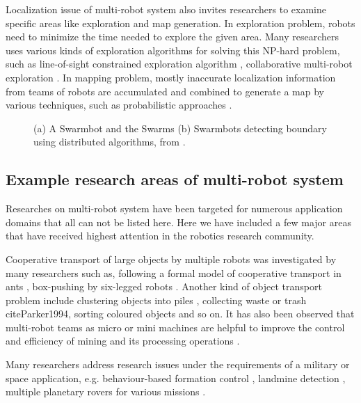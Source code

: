 Localization issue of multi-robot system also invites researchers to examine specific areas like exploration and map generation. In exploration problem, robots need to minimize the time needed to explore the given area. Many researchers uses various kinds of exploration algorithms for solving this NP-hard problem, such as line-of-sight constrained exploration algorithm , collaborative multi-robot exploration \cite{Burgard+2000}. In mapping problem, mostly inaccurate localization information from teams of robots are accumulated and combined to generate a map by various techniques, such as probabilistic approaches \cite{Thurn+2000}.
\begin{figure}
\centering
{} 
\hspace{0.25cm}
\caption{ (a) A Swarmbot and the Swarms 
 (b) Swarmbots detecting boundary using distributed algorithms, from \protect{}.}
\label{fig:swarmbot-boundary-detection}
\end{figure}
\subsection*{Example research areas of multi-robot system}
\label{bg:mrs:eg}
Researches on multi-robot system have been targeted for numerous application domains that all can not be listed here. Here we have included a few major areas that have received highest attention in the robotics research community. 

Cooperative transport of large objects  by multiple robots was investigated by many researchers such as, following a formal model of cooperative transport in ants \cite{Kube+1993}, box-pushing by six-legged robots \cite{Mataric+1995}. Another kind of object transport problem include clustering objects into piles  \cite{Beckers+1994}, collecting waste or trash cite{Parker1994}, sorting coloured objects  \cite{Melhuish+1998} and so on. It has also been observed that multi-robot teams as micro or mini machines are helpful to improve the control and efficiency of mining and its processing operations \cite{Dunbar+2002}. 

Many researchers address research issues under the requirements of a military or space application, e.g. behaviour-based formation control \cite{Balch+1998}, landmine detection \cite{Franklin+1995}, multiple planetary rovers for various missions \cite{Huntsberger2004}.

